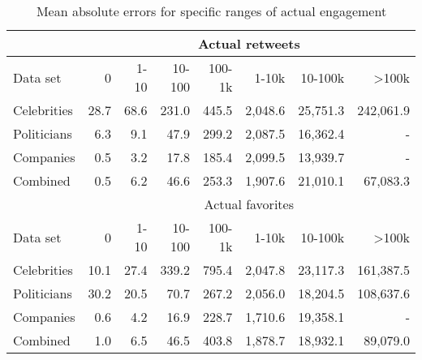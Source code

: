 \begin{table}
  \begin{tabular}{lrrrrrrr}
    \toprule
    & \multicolumn{7}{c}{Actual retweets} \\
    \midrule
    Data set & 0 & 1-10 & 10-100 & 100-1k & 1-10k & 10-100k & >100k \\
    \midrule
    Celebrities & 28.7 & 68.6 & 231.0 & 445.5 & 2,048.6 & 25,751.3 & 242,061.9 \\
    Politicians & 6.3 & 9.1 & 47.9 & 299.2 & 2,087.5 & 16,362.4 & - \\
    Companies & 0.5 & 3.2 & 17.8 & 185.4 & 2,099.5 & 13,939.7 & - \\
    Combined & 0.5 & 6.2 & 46.6 & 253.3 & 1,907.6 & 21,010.1 & 67,083.3 \\
    \bottomrule
    \toprule
    & \multicolumn{7}{c}{Actual favorites} \\
    \midrule
    Data set & 0 & 1-10 & 10-100 & 100-1k & 1-10k & 10-100k & >100k \\
    \midrule
    Celebrities & 10.1 & 27.4 & 339.2 & 795.4 & 2,047.8 & 23,117.3 & 161,387.5 \\
    Politicians & 30.2 & 20.5 & 70.7 & 267.2 & 2,056.0 & 18,204.5 & 108,637.6 \\
    Companies & 0.6 & 4.2 & 16.9 & 228.7 & 1,710.6 & 19,358.1 & - \\
    Combined & 1.0 & 6.5 & 46.5 & 403.8 & 1,878.7 & 18,932.1 & 89,079.0 \\
    \bottomrule
  \end{tabular}
  \caption[Detailed regression results for multi-input deep neural networks]{Mean absolute errors for specific ranges of actual engagement}
  \label{tab:d1_regression_eval}
\end{table}



